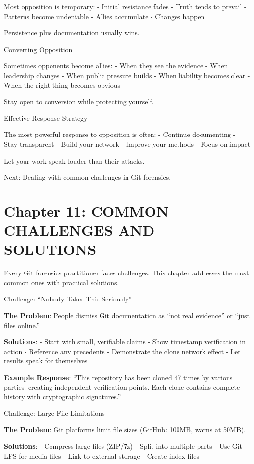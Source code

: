 Most opposition is temporary: - Initial resistance fades - Truth tends
to prevail - Patterns become undeniable - Allies accumulate - Changes
happen

Persistence plus documentation usually wins.

Converting Opposition

Sometimes opponents become allies: - When they see the evidence - When
leadership changes - When public pressure builds - When liability
becomes clear - When the right thing becomes obvious

Stay open to conversion while protecting yourself.

Effective Response Strategy

The most powerful response to opposition is often: - Continue
documenting - Stay transparent - Build your network - Improve your
methods - Focus on impact

Let your work speak louder than their attacks.

Next: Dealing with common challenges in Git forensics.

\section{Chapter 11: COMMON CHALLENGES AND
SOLUTIONS}\label{chapter-11-common-challenges-and-solutions}

Every Git forensics practitioner faces challenges. This chapter
addresses the most common ones with practical solutions.

Challenge: ``Nobody Takes This Seriously''

\textbf{The Problem}: People dismiss Git documentation as ``not real
evidence'' or ``just files online.''

\textbf{Solutions}: - Start with small, verifiable claims - Show
timestamp verification in action - Reference any precedents -
Demonstrate the clone network effect - Let results speak for themselves

\textbf{Example Response}: ``This repository has been cloned 47 times by
various parties, creating independent verification points. Each clone
contains complete history with cryptographic signatures.''

Challenge: Large File Limitations

\textbf{The Problem}: Git platforms limit file sizes (GitHub: 100MB,
warns at 50MB).

\textbf{Solutions}: - Compress large files (ZIP/7z) - Split into
multiple parts - Use Git LFS for media files - Link to external storage
- Create index files

